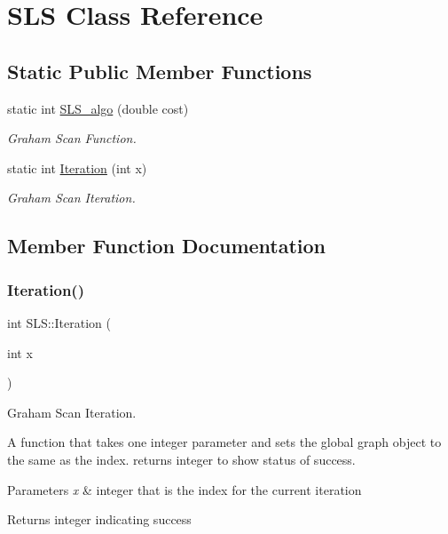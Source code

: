 \hypertarget{class_s_l_s}{}\section{S\+LS Class Reference}
\label{class_s_l_s}
\subsection*{Static Public Member Functions}
\begin{DoxyCompactItemize}
\item 
static int \mbox{\hyperlink{class_s_l_s_ab3f5414fa6ffb0a5979b887edf33614f}{S\+L\+S\+\_\+algo}} (double cost)
\begin{DoxyCompactList}\small\item\em Graham Scan Function. \end{DoxyCompactList}\item 
static int \mbox{\hyperlink{class_s_l_s_a154ad6b683a417263ab518ec58b355f8}{Iteration}} (int x)
\begin{DoxyCompactList}\small\item\em Graham Scan Iteration. \end{DoxyCompactList}\end{DoxyCompactItemize}


\subsection{Member Function Documentation}
\mbox{\label{class_s_l_s_a154ad6b683a417263ab518ec58b355f8}} 
\subsubsection{\texorpdfstring{Iteration()}{Iteration()}}
{\footnotesize\ttfamily int S\+L\+S\+::\+Iteration (\begin{DoxyParamCaption}\item[{int}]{x }\end{DoxyParamCaption})\hspace{0.3cm}{\ttfamily [static]}}



Graham Scan Iteration. 

A function that takes one integer parameter and sets the global graph object to the same as the index. returns integer to show status of success. 
\begin{DoxyParams}{Parameters}
{\em x} & integer that is the index for the current iteration \\
\hline
\end{DoxyParams}
\begin{DoxyReturn}{Returns}
integer indicating success 
\end{DoxyReturn}
\mbox{\label{class_s_l_s_ab3f5414fa6ffb0a5979b887edf33614f}} 
